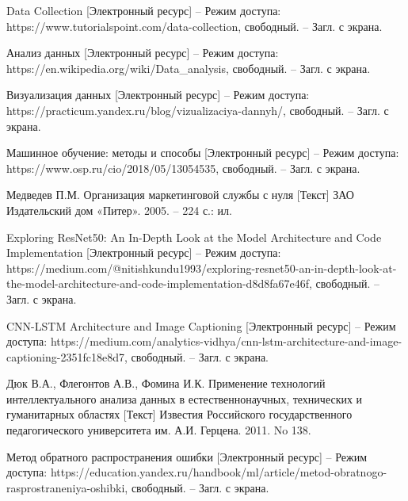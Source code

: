 \begin{references}
	\item\label{ref:data-collection} Data Collection [Электронный ресурс] – Режим доступа: https://www.tutorialspoint.com/data-collection, свободный. – Загл. с экрана.

	\item\label{ref:data-analysis} Анализ данных [Электронный ресурс] – Режим доступа: https://en.wikipedia.org/wiki/Data\_analysis, свободный. – Загл. с экрана.

	\item\label{ref:data-visualization} Визуализация данных [Электронный ресурс] – Режим доступа: https://practicum.yandex.ru/blog/vizualizaciya-dannyh/, свободный. – Загл. с экрана.

	\item\label{ref:machine-learning} Машинное обучение: методы и способы [Электронный ресурс] – Режим доступа: https://www.osp.ru/cio/2018/05/13054535, свободный. – Загл. с экрана.

	\item\label{ref:marketing} Медведев П.М. Организация маркетинговой службы с нуля [Текст] ЗАО Издательский дом «Питер». 2005. – 224 с.: ил.

	\item\label{ref:res-net} Exploring ResNet50: An In-Depth Look at the Model Architecture and Code Implementation [Электронный ресурс] – Режим доступа: https://medium.com/@nitishkundu1993/exploring-resnet50-an-in-depth-look-at-the-model-architecture-and-code-implementation-d8d8fa67e46f, свободный. – Загл. с экрана.

	\item\label{ref:cnn-lstm} CNN-LSTM Architecture and Image Captioning [Электронный ресурс] – Режим доступа: https://medium.com/analytics-vidhya/cnn-lstm-architecture-and-image-captioning-2351fc18e8d7, свободный. – Загл. с экрана.
	
	\item\label{ref:neuron} Дюк В.А., Флегонтов А.В., Фомина И.К. Применение технологий интеллектуального анализа данных в естественнонаучных, технических и гуманитарных областях [Текст] Известия Российского государственного педагогического университета им. А.И. Герцена. 2011. No 138.

	\item\label{ref:back-error} Метод обратного распространения ошибки [Электронный ресурс] – Режим доступа: https://education.yandex.ru/handbook/ml/article/metod-obratnogo-rasprostraneniya-oshibki, свободный. – Загл. с экрана.


\end{references}
